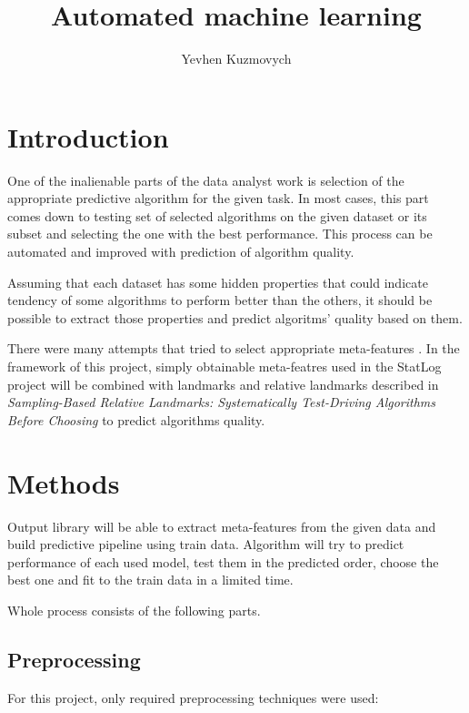 \documentclass[hidelinks, english]{mvi-report}
\title{Automated machine learning}
\author{Yevhen Kuzmovych}
\affiliation{ČVUT - FIT}
\begin{document}
\maketitle

\section{Introduction}

One of the inalienable parts of the data analyst work is selection of the appropriate predictive algorithm for
the given task. In most cases, this part comes down to testing set of selected algorithms on the given dataset or its
subset and selecting the one with the best performance. This process can be automated and improved with prediction of
algorithm quality.

Assuming that each dataset has some hidden properties that could indicate tendency of some algorithms to perform
better than the others, it should be possible to extract those properties and predict algoritms' quality based on them.

There were many attempts that tried to select appropriate meta-features
\cite{sampling-based-relative-landmarks}\cite{statlog}\cite{meta-learning-for-algorithm-selection}. In the framework of
this project, simply obtainable meta-featres used in the StatLog project\cite{statlog} will be combined with landmarks
and relative landmarks described in \textit{Sampling-Based Relative Landmarks: Systematically Test-Driving Algorithms
Before Choosing}\cite{sampling-based-relative-landmarks} to predict algorithms quality.


\section{Methods}

Output library will be able to extract meta-features from the given data and build predictive pipeline using train data.
Algorithm will try to predict performance of each used model, test them in the predicted order, choose the best one and
fit to the train data in a limited time.

Whole process consists of the following parts.

\subsection{Preprocessing}
For this project, only required preprocessing techniques were used:
\end{document}
